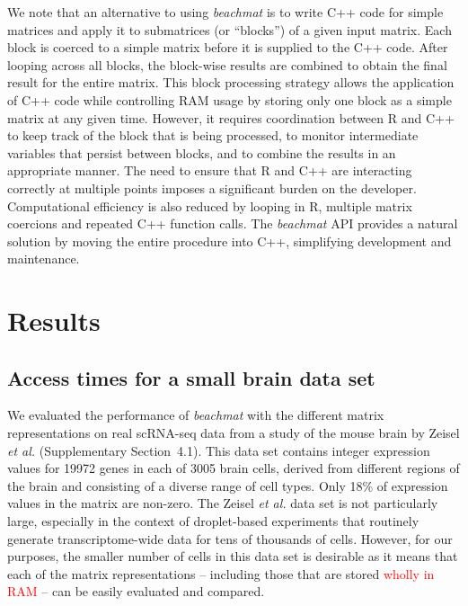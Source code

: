 \documentclass[10pt,letterpaper]{article}
\newcommand{\suppseclayoutoptim}{2}
\newcommand{\suppsecrealzeisel}{4.1}
\newcommand{\beachmat}{\textit{beachmat}}
\newcommand{\revised}[1]{\textcolor{red}{#1}}
\begin{document}

We note that an alternative to using \beachmat{} is to write C++ code for simple matrices and apply it to submatrices (or ``blocks'') of a given input matrix.
Each block is coerced to a simple matrix before it is supplied to the C++ code.
After looping across all blocks, the block-wise results are combined to obtain the final result for the entire matrix.
This block processing strategy allows the application of C++ code while controlling RAM usage by storing only one block as a simple matrix at any given time.
However, it requires coordination between R and C++ to keep track of the block that is being processed, to monitor intermediate variables that persist between blocks, and to combine the results in an appropriate manner.
The need to ensure that R and C++ are interacting correctly at multiple points imposes a significant burden on the developer.
Computational efficiency is also reduced by looping in R, multiple matrix coercions and repeated C++ function calls.
The \beachmat{} API provides a natural solution by moving the entire procedure into C++, simplifying development and maintenance.

\section*{Results}

\subsection*{Access times for a small brain data set}
We evaluated the performance of \beachmat{} with the different matrix representations on real scRNA-seq data from a study of the mouse brain by Zeisel \textit{et al.} \cite{zeisel2015brain} (Supplementary Section~\suppsecrealzeisel{}). 
This data set contains integer expression values for 19972 genes in each of 3005 brain cells, derived from different regions of the brain and consisting of a diverse range of cell types.
Only 18\% of expression values in the matrix are non-zero.
The Zeisel \textit{et al.} data set is not particularly large, especially in the context of droplet-based experiments that routinely generate transcriptome-wide data for tens of thousands of cells.
However, for our purposes, the smaller number of cells in this data set is desirable as it means that each of the matrix representations -- including those that are stored \revised{wholly in RAM} -- can be easily evaluated and compared.
\end{document}

